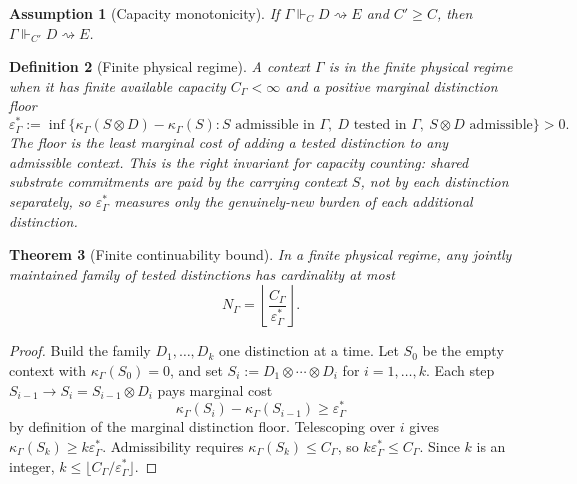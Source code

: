 \documentclass[11pt]{article}
\newtheorem{theorem}{Theorem}[section]
\newtheorem{definition}[theorem]{Definition}
\newtheorem{assumption}[theorem]{Assumption}
\theoremstyle{remark}
\newcommand{\G}{\Gamma}
\newcommand{\entails}{\Vdash}
\newcommand{\goes}{\rightsquigarrow}
\newcommand{\Cost}{\kappa}
\newcommand{\floor}{\varepsilon^{\!*}_{\G}}
\begin{document}
\begin{assumption}[Capacity monotonicity]\label{ass:cap-mono}
If \(\G\entails_C D\goes E\) and \(C'\ge C\), then \(\G\entails_{C'} D\goes E\).
\end{assumption}

\begin{definition}[Finite physical regime]
A context \(\G\) is in the finite physical regime when it has finite available capacity \(C_\G<\infty\) and a positive marginal distinction floor
\[
        \floor:=\inf\Big\{\Cost_\G(S\otimes D)-\Cost_\G(S):S\text{ admissible in }\G,\ D\text{ tested in }\G,\ S\otimes D\text{ admissible}\Big\}>0.
\]
The floor is the least marginal cost of adding a tested distinction to any admissible context.  This is the right invariant for capacity counting: shared substrate commitments are paid by the carrying context $S$, not by each distinction separately, so $\floor$ measures only the genuinely-new burden of each additional distinction.
\end{definition}

\begin{theorem}[Finite continuability bound]
In a finite physical regime, any jointly maintained family of tested distinctions has cardinality at most
\[
        N_\G=\left\lfloor \frac{C_\G}{\floor}\right\rfloor .
\]
\end{theorem}

\begin{proof}
Build the family $D_1,\ldots,D_k$ one distinction at a time.  Let $S_0$ be the empty context with $\Cost_\G(S_0)=0$, and set $S_i:=D_1\otimes\cdots\otimes D_i$ for $i=1,\ldots,k$.  Each step $S_{i-1}\to S_i = S_{i-1}\otimes D_i$ pays marginal cost
\[
        \Cost_\G(S_i)-\Cost_\G(S_{i-1})\ge \floor
\]
by definition of the marginal distinction floor.  Telescoping over $i$ gives $\Cost_\G(S_k)\ge k\floor$.  Admissibility requires $\Cost_\G(S_k)\le C_\G$, so $k\floor\le C_\G$.  Since $k$ is an integer, $k\le\lfloor C_\G/\floor\rfloor$.
\end{proof}
\end{document}
